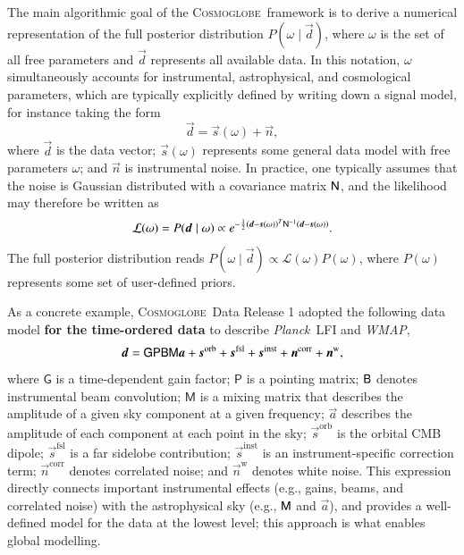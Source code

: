 \documentclass[twocolumn]{aa}
\def\WMAP{\emph{WMAP}}
\def\Planck{\emph{Planck}}
\renewcommand{\d}[0]{\vec{d}}
\newcommand{\B}[0]{\tens{B}}
\newcommand{\n}[0]{\vec{n}}
\newcommand{\s}[0]{\vec{s}}
\renewcommand{\a}[0]{\vec{a}}
\newcommand{\N}[0]{\tens{N}}
\newcommand{\M}[0]{\tens{M}}
\renewcommand{\P}[0]{\tens{P}}
\newcommand{\cosmoglobe}{\textsc{Cosmoglobe}}
\begin{document}
The main algorithmic goal of the \cosmoglobe\ framework is to derive a numerical representation of the full posterior distribution $P(\omega\mid\d)$, where $\omega$ is the set of all free parameters and $\d$ represents all available data. In this notation, $\omega$ simultaneously accounts for instrumental, astrophysical, and cosmological parameters, which are typically explicitly defined by writing down a signal model, for instance taking the form
\begin{equation}
    \label{eq:data_model}
    \d = \s(\omega) + \n,
\end{equation}
where $\d$ is the data vector; $\s(\omega)$ represents some general data model with free parameters $\omega$; and $\n$ is instrumental noise. In practice, one typically assumes that the noise is Gaussian distributed with a covariance matrix $\N$, and the likelihood may therefore be written as
\begin{equation}
  \mathcal{L}(\omega) = P(\d\mid\omega) \propto e^{-\frac{1}{2}\left(\d-\s(\omega)\right)^T\N^{-1}\left(\d-\s(\omega)\right)}.
\end{equation}
The full posterior distribution reads $P(\omega\mid\d) \propto \mathcal{L}(\omega)P(\omega)$, where $P(\omega)$ represents some set of user-defined priors.

As a concrete example, \cosmoglobe\ Data Release 1 \citep{watts2023_dr1} adopted the following data model \textbf{for the time-ordered data} to describe \Planck\ LFI and \WMAP,
\begin{equation}
	\label{eq:model}
	\d =\tens{G}\P\B\M\a+ \s^\mathrm{orb}
	+\s^\mathrm{fsl} + \s^\mathrm{inst}+ \n^\mathrm{corr}+\n^\mathrm{w},
\end{equation}
where $\mathsf G$ is a time-dependent gain factor; $\mathsf P$ is a pointing matrix;
$\B$ denotes instrumental beam convolution; $\mathsf M$ is a mixing matrix that describes the amplitude of a given sky component at a given frequency; $\a$ describes the amplitude of each component at each point in the sky; $\s^\mathrm{orb}$ is the orbital CMB dipole; $\s^\mathrm{fsl}$ is a far sidelobe contribution; $\s^\mathrm{inst}$ is an instrument-specific correction term; $\n^\mathrm{corr}$ denotes correlated noise; and $\n^\mathrm{w}$ denotes white noise. This expression directly connects important instrumental effects (e.g., gains, beams, and correlated noise) with the astrophysical sky (e.g., $\M$ and $\a$), and provides a well-defined model for the data at the lowest level; this approach is what enables global modelling.
\end{document}
